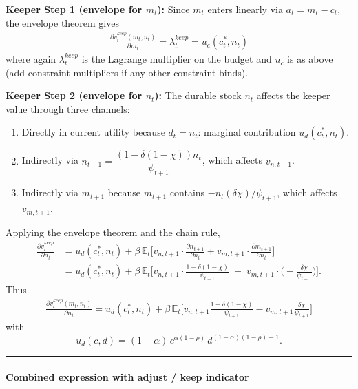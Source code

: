 \documentclass[\econtexMain]{subfiles}
\begin{document}
\textbf{Keeper Step 1 (envelope for \(m_t\)):} Since \(m_t\) enters linearly via \(a_t=m_t-c_t\), the envelope theorem gives
\begin{align}
		\frac{\partial v_t^{keep}(m_t,n_t)}{\partial m_t}
		= \lambda_t^{keep}
		= u_c(c_t^\ast,n_t)
\label{eq:keep_m}
\end{align}
where again \(\lambda_t^{keep}\) is the Lagrange multiplier on the budget and \(u_c\) is as above (add constraint multipliers if any other constraint binds).

\textbf{Keeper Step 2 (envelope for \(n_t\)):} The durable stock \(n_t\) affects the keeper value through three channels:
\begin{enumerate}
	\item Directly in current utility because \(d_t=n_t\): marginal contribution \(u_d(c_t^\ast,n_t)\).
	\item Indirectly via \(n_{t+1} = \dfrac{(1-\delta(1-\chi))n_t}{\psi_{t+1}}\), which affects \(v_{n,t+1}\).
	\item Indirectly via \(m_{t+1}\) because \(m_{t+1}\) contains \(-n_t(\delta\chi)/\psi_{t+1}\), which affects \(v_{m,t+1}\).
\end{enumerate}
Applying the envelope theorem and the chain rule,
\begin{align}
	\frac{\partial v_t^{keep}}{\partial n_t}
	&= u_d(c_t^\ast,n_t)
	+ \beta\,\mathbb{E}_t\Bigg[ v_{n,t+1}\cdot\frac{\partial n_{t+1}}{\partial n_t}
	+ v_{m,t+1}\cdot\frac{\partial m_{t+1}}{\partial n_t}\Bigg] \\
	&= u_d(c_t^\ast,n_t)
	+ \beta\,\mathbb{E}_t\Bigg[ v_{n,t+1}\cdot\frac{1-\delta(1-\chi)}{\psi_{t+1}}
	\;+\; v_{m,t+1}\cdot\Big(-\frac{\delta\chi}{\psi_{t+1}}\Big)\Bigg].
\end{align}
Thus
\begin{align}
		\frac{\partial v_t^{keep}(m_t,n_t)}{\partial n_t}
		= u_d(c_t^\ast,n_t)
		+ \beta\,\mathbb{E}_t\Bigg[ v_{n,t+1}\frac{1-\delta(1-\chi)}{\psi_{t+1}}
		- v_{m,t+1}\frac{\delta\chi}{\psi_{t+1}}\Bigg]
\label{eq:keep_n}
\end{align}
with
\[
u_d(c,d) = (1-\alpha)\, c^{\alpha(1-\rho)}\, d^{(1-\alpha)(1-\rho)-1}.
\]

\bigskip
\hrule
\bigskip

\paragraph{Combined expression with adjust / keep indicator}
\end{document}
